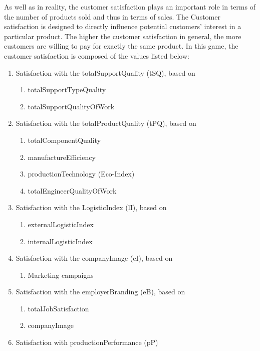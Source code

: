 As well as in reality, the customer satisfaction plays an important role in terms of the number of products sold and thus in terms of sales. %
The Customer satisfaction is designed to directly influence potential customers' interest in a particular product. The higher the customer satisfaction in general, the more customers are willing to pay for exactly the same product. 
In this game, the customer satisfaction is composed of the values listed below:
   \begin{enumerate}
      \item Satisfaction with the totalSupportQuality (tSQ), based on
      \begin{enumerate}
         \item totalSupportTypeQuality
         \item totalSupportQualityOfWork
      \end{enumerate}
      \item Satisfaction with the totalProductQuality (tPQ), based on
      \begin{enumerate}
         \item totalComponentQuality
         \item manufactureEfficiency
         \item productionTechnology (Eco-Index)
         \item totalEngineerQualityOfWork
      \end{enumerate}
      \item Satisfaction with the LogisticIndex (lI), based on
      \begin{enumerate}
         \item externalLogisticIndex
         \item internalLogisticIndex
      \end{enumerate}
      \item Satisfaction with the companyImage (cI), based on
      \begin{enumerate}
          \item Marketing campaigns
      \end{enumerate}
      \item Satisfaction with the employerBranding (eB), based on 
      \begin{enumerate}
          \item totalJobSatisfaction
          \item companyImage
      \end{enumerate}
      \item Satisfaction with productionPerformance (pP)
   \end{enumerate}
